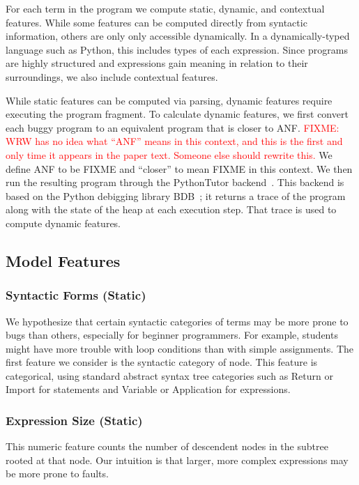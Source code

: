 \documentclass[conference]{IEEEtran}
\newcommand{\fixme}[1]{\textcolor{red}{FIXME: #1}}
\begin{document}
For each term in the program we compute static, dynamic, and contextual
features. While some features can be computed directly from syntactic
information, others are only only accessible dynamically. In a
dynamically-typed language such as Python, this includes types of each
expression. Since programs are highly structured and expressions gain
meaning in relation to their surroundings, we also include contextual
features. 

While static features can be computed via parsing, dynamic features require
executing the program fragment. To calculate dynamic features, we first
convert each buggy program to an equivalent program that is closer to ANF.
\fixme{WRW has no idea what ``ANF'' means in this context, and this is the
first and only time it appears in the paper text. Someone else should
rewrite this.} We define ANF to be FIXME and ``closer'' to mean FIXME in
this context. We then run the resulting program through the PythonTutor
backend~\cite{FIXME}.  This backend is based on the Python debigging
library BDB~\cite{FIXME}; it returns a trace of the program along with the
state of the heap at each execution step. That trace is used to compute
dynamic features.

\subsection{Model Features}
\label{sec-features} 

\subsubsection{Syntactic Forms (Static)}

We hypothesize that certain syntactic categories of terms may be more
prone to bugs than others, especially for beginner programmers.  For
example, students might have more trouble with loop conditions than with
simple assignments. The first feature we consider is the syntactic
category of node. This feature is categorical, using standard abstract
syntax tree categories such as Return or Import for statements and Variable 
or Application for expressions.

\subsubsection{Expression Size (Static)} 

This numeric feature counts the number of descendent nodes in the subtree
rooted at that node. Our intuition is that larger, more complex expressions
may be more prone to faults. 
\end{document}
